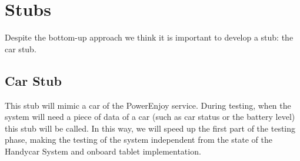 \section{Stubs}
Despite the bottom-up approach we think it is important to develop a stub: the car stub.
\subsection{Car Stub}
This stub will mimic a car of the PowerEnjoy service. During testing, when the system will need a piece of data of a car (such as car status or the battery level) this stub will be called. In this way, we will speed up the first part of the testing phase, making the testing of the system independent from the state of the Handycar System and onboard tablet implementation.